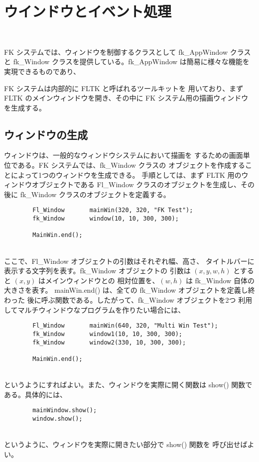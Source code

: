 \chapter{ウインドウとイベント処理} \label{sec:window} ~

FK システムでは、ウィンドウを制御するクラスとして fk\_AppWindow クラスと
fk\_Window クラスを提供している。fk\_AppWindow は簡易に様々な機能を
実現できるものであり、

FK システムは内部的に FLTK と呼ばれるツールキットを
用いており、まず FLTK のメインウィンドウを開き、その中に
FK システム用の描画ウィンドウを生成する。

\section{ウィンドウの生成}
ウィンドウは、一般的なウィンドウシステムにおいて描画を
するための画面単位である。FK システムでは、fk\_Window クラスの
オブジェクトを作成することによって1つのウィンドウを生成できる。
手順としては、まず FLTK 用のウィンドウオブジェクトである
Fl\_Window クラスのオブジェクトを生成し、その後に fk\_Window
クラスのオブジェクトを定義する。
\\
\begin{screen}
\begin{verbatim}
        Fl_Window       mainWin(320, 320, "FK Test");
        fk_Window       window(10, 10, 300, 300);

        MainWin.end();
\end{verbatim}
\end{screen}
~ \\
ここで、Fl\_Window オブジェクトの引数はそれぞれ幅、高さ、
タイトルバーに表示する文字列を表す。fk\_Window オブジェクトの
引数は \((x, y, w, h)\) とすると \((x, y)\) はメインウィンドウとの
相対位置を、\((w, h)\) は fk\_Window 自体の大きさを表す。
mainWin.end() は、全ての fk\_Window オブジェクトを定義し終わった
後に呼ぶ関数である。したがって、fk\_Window オブジェクトを2つ
利用してマルチウィンドウなプログラムを作りたい場合には、
\\
\begin{breakbox}
\begin{verbatim}
        Fl_Window       mainWin(640, 320, "Multi Win Test");
        fk_Window       window1(10, 10, 300, 300);
        fk_Window       window2(330, 10, 300, 300);

        MainWin.end();
\end{verbatim}
\end{breakbox}
~ \\
というようにすればよい。また、ウィンドウを実際に開く関数は show() 関数で
ある。具体的には、
\\
\begin{screen}
\begin{verbatim}
        mainWindow.show();
        window.show();
\end{verbatim}
\end{screen}
~ \\
というように、ウィンドウを実際に開きたい部分で show() 関数を
呼び出せばよい。

